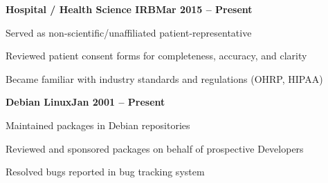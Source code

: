 \documentclass[letterpaper,10pt]{article}
\newcommand{\heading}[2]{
  \hspace{10pt}#1\hfill#2\\
}
\newcommand{\headingBf}[2]{
  \heading{\textbf{#1}}{\textbf{#2}}
}
\newenvironment{resume_list}{
  \vspace{-5pt}
  \begin{itemize}[itemsep=0px, parsep=2pt, leftmargin=30pt]
}{
  \end{itemize}
  \vspace{-2pt}
}
\begin{document}
  \headingBf{Hospital / Health Science IRB}{Mar 2015 -- Present}
  \begin{resume_list}
    \item Served as non-scientific/unaffiliated patient-representative
    \item Reviewed patient consent forms for completeness, accuracy, and clarity
    \item Became familiar with industry standards and regulations (OHRP, HIPAA)
  \end{resume_list}

  \headingBf{Debian Linux}{Jan 2001 -- Present}
  \begin{resume_list}
    \item Maintained packages in Debian repositories
    \item Reviewed and sponsored packages on behalf of prospective Developers
    \item Resolved bugs reported in bug tracking system
  \end{resume_list}
\end{document}
